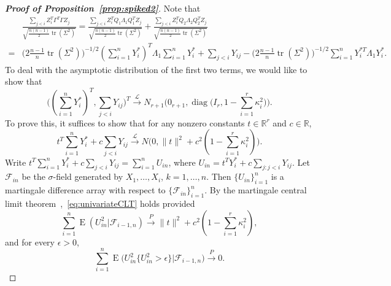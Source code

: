 \documentclass[3p]{elsarticle}
\DeclareMathOperator{\mytr}{tr}
\DeclareMathOperator{\mydiag}{diag}
\DeclareMathOperator{\myE}{E}
\theoremstyle{plain}
\theoremstyle{definition}
\theoremstyle{remark}
\begin{document}
\begin{proof}[\textbf{Proof of Proposition~\ref{prop:spiked2}}]
    Note that
    $$
    \begin{aligned}
        &
    \frac{\sum_{j<i} Z_i^T \Gamma^T \Gamma Z_j }
    {\sqrt{\frac{n(n-1)}{2}\mytr(\Sigma^2)}}
        =
        \frac{\sum_{j<i}Z_i^T Q_1 \Lambda_1 Q_1^T Z_j}
    {\sqrt{\frac{n(n-1)}{2}\mytr(\Sigma^2)}}
        +
        \frac{\sum_{j<i}Z_i^T Q_2 \Lambda_2 Q_2^T Z_j}
    {\sqrt{\frac{n(n-1)}{2}\mytr(\Sigma^2)}}
    \\
        =&
        \big(2\frac{n-1}{n}\mytr(\Sigma^2)\big)^{-1/2}(\sum_{i=1}^n  Y_i^*)^T \Lambda_1 \sum_{i=1}^n  Y_i^*
        +
        \sum_{j<i} Y_{ij}
        -
        \big(2\frac{n-1}{n}\mytr(\Sigma^2)\big)^{-1/2}
        \sum_{i=1}^n Y_i^{*T}\Lambda_1 Y_i^*
        .
    \end{aligned}
    $$
    To deal with the asymptotic distribution of the first two terms, we would like to show that
    \begin{equation}\label{eq:toProveCLT}
        \big(
        (\sum_{i=1}^n Y_i^*)^T,
        \sum_{j<i} Y_{ij}
        \big)^T
    \xrightarrow{\mathcal{L}} N_{r+1}\Big(0_{r+1}, \mydiag \big(I_{r},1-\sum_{i=1}^r \kappa_i^2\big)\Big).
\end{equation}
    To prove this, it suffices to show that for any nonzero constants $t\in\mathbb{R}^r$ and $c\in\mathbb{R}$,
    \begin{equation}\label{eq:univariateCLT}
        t^T \sum_{i=1}^n Y_i^* +c \sum_{j<i} Y_{ij}
        \xrightarrow{\mathcal{L}}N\big(0,\|t\|^2+c^2(1-\sum_{i=1}^r \kappa_i^2)\big).
    \end{equation}
    Write $t^T \sum_{i=1}^n Y_i^*+c \sum_{j<i}Y_{ij} =\sum_{i=1}^n U_{in}$,
    where 
    $U_{in}=
    t^T Y_i^*+c  \sum_{j: j<i}Y_{ij}
    $.
    Let $\mathcal{F}_{in}$ be the $\sigma$-field generated by $X_1,\dots, X_i$, $k=1,\ldots,n$.
    Then $\{U_{in}\}_{i=1}^n$ is a martingale difference array with respect to $\{\mathcal{F}_{in}\}_{i=1}^n$.
    By the martingale central limit theorem~\citep[Chapter VIII, Theorem 1]{pollard1984convergence},~\eqref{eq:univariateCLT} holds provided
     \begin{equation}\label{eq:MCLTcondition1}
         \sum_{i=1}^n \myE(U_{in}^2 |\mathcal{F}_{i-1,n})\xrightarrow{P} \|t\|^2 + c^2(1-\sum_{i=1}^r \kappa_i^2),
     \end{equation}
     and for every $\epsilon>0$,
     \begin{equation}\label{eq:MCLTcondition2}
         \sum_{i=1}^n \myE\big(U_{in}^2\big\{U_{in}^2>\epsilon \big\}\big|\mathcal{F}_{i-1,n}\big)\xrightarrow{P} 0.

\end{equation}
\end{proof}
\end{document}
